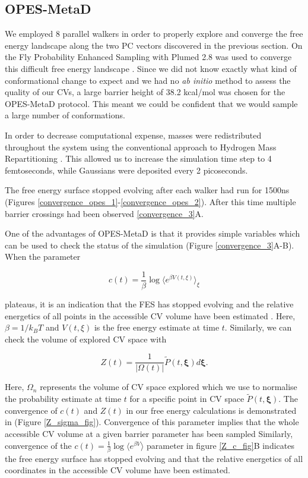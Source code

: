 \subsection{OPES-MetaD}
We employed 8 parallel walkers in order to properly explore and converge the free energy landscape along the two PC vectors discovered in the previous section. On the Fly Probability Enhanced Sampling with Plumed 2.8 was used to converge this difficult free energy landscape \cite{invernizzi2020, tribello2014}. Since we did not know exactly what kind of conformational change to expect and we had no \textit {ab initio} method to assess the quality of our CVs, a large barrier height of 38.2 kcal/mol was chosen for the OPES-MetaD protocol. This meant we could be confident that we would sample a large number of conformations. 

In order to decrease computational expense, masses were redistributed throughout the system using the conventional approach to Hydrogen Mass Repartitioning \cite{hopkins2015, balusek2019}. This allowed us to increase the simulation time step to 4 femtoseconds, while Gaussians were deposited every 2 picoseconds.

The free energy surface stopped evolving after each walker had run for 1500ns (Figures \ref{convergence_opes_1}-\ref{convergence_opes_2}). After this time multiple barrier crossings had been observed \ref{convergence_3}A.

One of the advantages of OPES-MetaD is that it provides simple variables which can be used to check the status of the simulation (Figure \ref{convergence_3}A-B). When the parameter 

\begin{equation}
	c(t) = \frac{1}{\beta} \log \langle e^{\beta V(t,\xi)} \rangle_\xi
\end{equation} 

plateaus, it is an indication that the FES has stopped evolving and the relative energetics of all points in the accessible CV volume have been estimated \cite{invernizzi2020, tiwary2015}. Here, $\beta=1/k_BT$ and $V(t,\xi)$ is the free energy estimate at time $t$. Similarly, we can check the volume of explored CV space with  

\begin{equation}
Z(t) = \frac{1}{| \Omega(t)|}  \tilde{P}(t, \mathbf{\xi}) d\mathbf{\xi}.
\end{equation} 

Here, $\Omega_n$ represents the volume of CV space explored which we use to normalise the probability estimate at time $t$ for a specific point in CV space $\tilde{P}(t, \mathbf{\xi})$. The convergence of $c(t)$ and $Z(t)$ in our free energy calculations is demonstrated in (Figure \ref{Z_sigma_fig}). Convergence of this parameter implies that the whole accessible CV volume at a given barrier parameter has been sampled Similarly, convergence of the $c(t) = \frac{1}{\beta} \log \langle e^{\beta V} \rangle$ parameter in figure \ref{Z_c_fig}B indicates the free energy surface has stopped evolving and that the relative energetics of all coordinates in the accessible CV volume have been estimated.  

